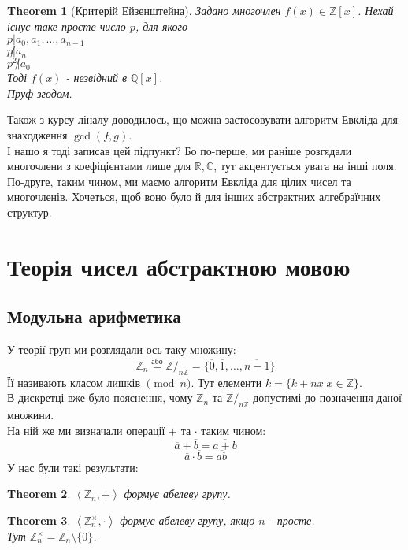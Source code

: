\documentclass[a4paper, 14pt]{extarticle}
\theoremstyle{theoremdd}
\newtheorem{theorem}{Theorem}[subsection]
\theoremstyle{theoremdd}
\theoremstyle{theoremdd}
\theoremstyle{theoremdd}
\theoremstyle{theoremdd}
\theoremstyle{theoremdd}
\theoremstyle{theoremdd}
\theoremstyle{theoremdd}
\begin{document}
\begin{theorem}[Критерій Ейзенштейна]
Задано многочлен $f(x) \in \mathbb{Z}[x]$. Нехай існує таке просте число $p$, для якого\\
$p | a_0,a_1,\dots,a_{n-1}$\\
$p \not| a_n$\\
$p^2 \not| a_0$\\
Тоді $f(x)$ - незвідний в $\mathbb{Q}[x]$.\\
\textit{Пруф згодом.}
\end{theorem}

Також з курсу ліналу доводилось, що можна застосовувати алгоритм Евкліда для знаходження $\gcd (f,g)$.
\bigskip \\
І нашо я тоді записав цей підпункт? Бо по-перше, ми раніше розгядали многочлени з коефіцієнтами лише для $\mathbb{R}, \mathbb{C}$, тут акцентується увага на інші поля.\\
По-друге, таким чином, ми маємо алгоритм Евкліда для цілих чисел та многочленів. Хочеться, щоб воно було й для інших абстрактних алгебраїчних структур.
\newpage

\section{Теорія чисел абстрактною мовою}
\subsection{Модульна арифметика}
У теорії груп ми розглядали ось таку множину:
$$ \mathbb{Z}_n \overset{\text{або}}{=} \mathbb{Z}/_{n \mathbb{Z}} = \{ \overline{0}, \overline{1}, \dots, \overline{n-1} \} $$
Її називають класом лишків $\pmod n$. Тут елементи $\overline{k} = \{k+nx | x \in \mathbb{Z}\}$.\\
В дискретці вже було пояснення, чому $\mathbb{Z}_n$ та $\mathbb{Z}/_{n \mathbb{Z}}$ допустимі до позначення даної множини.\\
На ній же ми визначали операції $+$ та $\cdot$ таким чином:\\
$$ \overline{a} + \overline{b} = \overline{a + b}$$
$$ \overline{a} \cdot \overline{b} = \overline{ab}$$
У нас були такі результати:
\begin{theorem}
$\left< \mathbb{Z}_n, + \right>$ формує абелеву групу.
\end{theorem}

\begin{theorem}
$\left< \mathbb{Z}_n^{\times}, \cdot \right>$ формує абелеву групу, якщо $n$ - просте. \\
Тут $\mathbb{Z}_n^{\times} = \mathbb{Z}_n \setminus \{0\}$.
\end{theorem}
\end{document}

